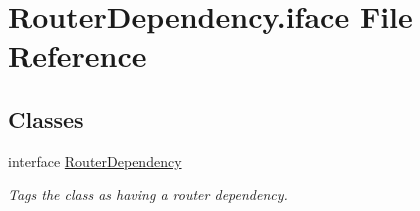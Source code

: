 \hypertarget{RouterDependency_8iface}{\section{Router\-Dependency.\-iface File Reference}
\label{RouterDependency_8iface}
}
\subsection*{Classes}
\begin{DoxyCompactItemize}
\item 
interface \hyperlink{interfaceRouterDependency}{Router\-Dependency}
\begin{DoxyCompactList}\small\item\em Tags the class as having a router dependency. \end{DoxyCompactList}\end{DoxyCompactItemize}
